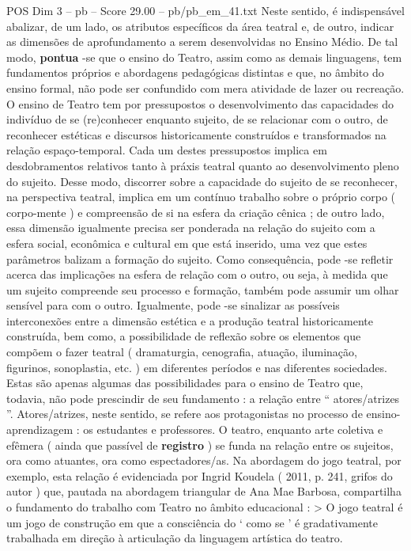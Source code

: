 \begin{textsample}{POS Dim 3 – pb – Score 29.00 – pb/pb\_em\_41.txt}
Neste sentido, é indispensável abalizar, de um lado, os atributos específicos da área teatral e, de outro, indicar as dimensões de aprofundamento a serem desenvolvidas no Ensino Médio.
De tal modo, \textbf{pontua} -se que o ensino do Teatro, assim como as demais linguagens, tem fundamentos próprios e abordagens pedagógicas distintas e que, no âmbito do ensino formal, não pode ser confundido com mera atividade de lazer ou recreação.
O ensino de Teatro tem por pressupostos o desenvolvimento das capacidades do indivíduo de se (re)conhecer enquanto sujeito, de se relacionar com o outro, de reconhecer estéticas e discursos historicamente construídos e transformados na relação espaço-temporal.
Cada um destes pressupostos implica em desdobramentos relativos tanto à práxis teatral quanto ao desenvolvimento pleno do sujeito.
Desse modo, discorrer sobre a capacidade do sujeito de se reconhecer, na perspectiva teatral, implica em um contínuo trabalho sobre o próprio corpo ( corpo-mente ) e compreensão de si na esfera da criação cênica ; de outro lado, essa dimensão igualmente precisa ser ponderada na relação do sujeito com a esfera social, econômica e cultural em que está inserido, uma vez que estes parâmetros balizam a formação do sujeito.
Como consequência, pode -se refletir acerca das implicações na esfera de relação com o outro, ou seja, à medida que um sujeito compreende seu processo e formação, também pode assumir um olhar sensível para com o outro.
Igualmente, pode -se sinalizar as possíveis interconexões entre a dimensão estética e a produção teatral historicamente construída, bem como, a possibilidade de reflexão sobre os elementos que compõem o fazer teatral ( dramaturgia, cenografia, atuação, iluminação, figurinos, sonoplastia, etc. ) em diferentes períodos e nas diferentes sociedades.
Estas são apenas algumas das possibilidades para o ensino de Teatro que, todavia, não pode prescindir de seu fundamento : a relação entre “ atores/atrizes ”.
Atores/atrizes, neste sentido, se refere aos protagonistas no processo de ensino-aprendizagem : os estudantes e professores.
O teatro, enquanto arte coletiva e efêmera ( ainda que passível de \textbf{registro} ) se funda na relação entre os sujeitos, ora como atuantes, ora como espectadores/as.
Na abordagem do jogo teatral, por exemplo, esta relação é evidenciada por Ingrid Koudela ( 2011, p. 241, grifos do autor ) que, pautada na abordagem triangular de Ana Mae Barbosa, compartilha o fundamento do trabalho com Teatro no âmbito educacional : > O jogo teatral é um jogo de construção em que a consciência do ‘ como se ’ é gradativamente trabalhada em direção à articulação da linguagem artística do teatro.

\end{textsample}
